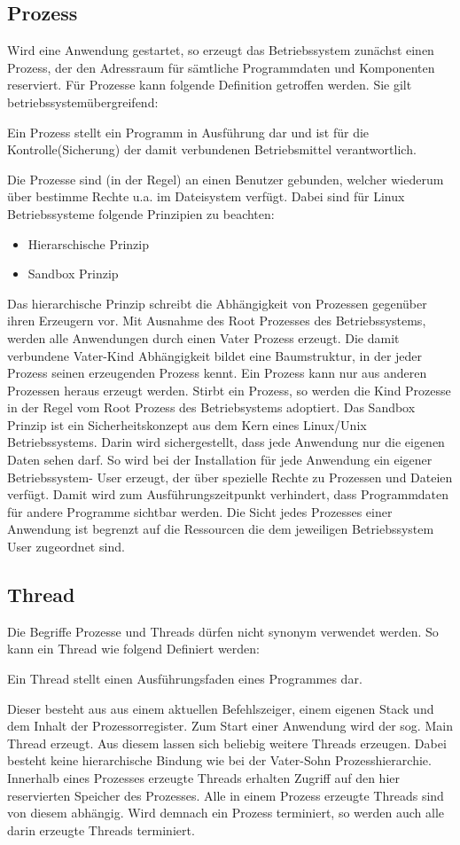 \documentclass[12pt,oneside,a4paper,bibtotoc,liststotoc]{scrreprt}
\begin{document}
\subsection{Prozess}
Wird eine Anwendung gestartet, so erzeugt das Betriebssystem zunächst einen Prozess, der den Adressraum für sämtliche Programmdaten und Komponenten reserviert. Für Prozesse kann folgende Definition getroffen werden. Sie gilt betriebssystemübergreifend:
\begin{center}
Ein Prozess stellt ein Programm in Ausführung dar und
ist für die Kontrolle(Sicherung) der damit verbundenen Betriebsmittel
verantwortlich.
\end{center}
Die Prozesse sind (in der Regel) an einen Benutzer gebunden, welcher wiederum über bestimme Rechte u.a. im Dateisystem verfügt. Dabei sind für Linux Betriebssysteme folgende Prinzipien zu beachten:
\begin{itemize}
\item Hierarschische Prinzip
\item Sandbox Prinzip
\end{itemize}
Das hierarchische Prinzip schreibt die Abhängigkeit von Prozessen gegenüber ihren Erzeugern vor. Mit Ausnahme des Root Prozesses des Betriebssystems, werden alle Anwendungen durch einen Vater Prozess erzeugt. Die damit verbundene Vater-Kind Abhängigkeit bildet eine Baumstruktur, in der jeder Prozess seinen erzeugenden Prozess kennt. Ein Prozess kann nur aus anderen Prozessen heraus erzeugt werden. Stirbt ein Prozess, so werden die Kind Prozesse in der Regel vom Root Prozess des Betriebsystems adoptiert.\newline
Das Sandbox Prinzip ist ein Sicherheitskonzept aus dem Kern eines Linux/Unix Betriebssystems. Darin wird sichergestellt, dass jede Anwendung nur die eigenen Daten sehen darf. So wird bei der Installation für jede Anwendung ein eigener Betriebssystem- User erzeugt, der über spezielle Rechte zu Prozessen und Dateien verfügt. Damit wird zum Ausführungszeitpunkt verhindert, dass Programmdaten für andere Programme sichtbar werden. Die Sicht jedes Prozesses einer Anwendung ist begrenzt auf die Ressourcen die dem jeweiligen Betriebssystem User zugeordnet sind.

\subsection{Thread}
Die Begriffe Prozesse und Threads dürfen nicht synonym verwendet werden. So kann ein Thread wie folgend Definiert werden:
\begin{center}
Ein Thread stellt einen Ausführungsfaden
eines Programmes dar.
\end{center}
Dieser besteht aus aus einem aktuellen Befehlszeiger, einem eigenen Stack und dem Inhalt der Prozessorregister. Zum Start einer Anwendung wird der sog. Main Thread erzeugt. Aus diesem lassen sich beliebig weitere Threads erzeugen. Dabei besteht keine hierarchische Bindung wie bei der Vater-Sohn Prozesshierarchie. Innerhalb eines Prozesses erzeugte Threads erhalten Zugriff auf den hier reservierten Speicher des Prozesses. Alle in einem Prozess erzeugte Threads sind von diesem abhängig. Wird demnach ein Prozess terminiert, so werden auch alle darin erzeugte Threads terminiert.
\end{document}

